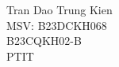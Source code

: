 \documentclass[preview]{standalone}
\begin{document}
Tran Dao Trung Kien\\MSV: B23DCKH068\\B23CQKH02-B\\PTIT\\
\end{document}
